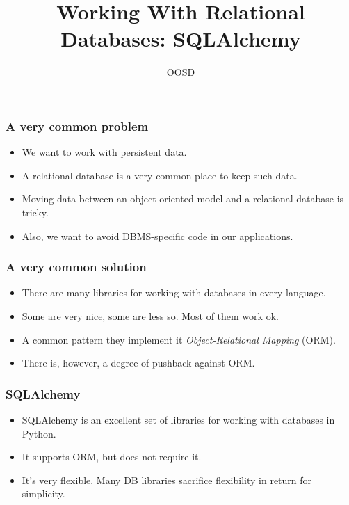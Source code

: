 \documentclass[10pt]{beamer}
\title{Working With Relational Databases: SQLAlchemy}
\author[IN710]{OOSD}
\institute[Otago Polytechnic]{
  School of Information Technology \\
  Otago Polytechnic \\
  Dunedin, New Zealand \\
}
\date{}
\begin{document}
\begin{frame}[plain]
  \titlepage
\end{frame}

\begin{frame}
	\frametitle{A very common problem}
	\begin{itemize}
		\item We want to work with persistent data.
		\item A relational database is a very common place to keep such data.
		\item Moving data between an object oriented model and a relational database is tricky.
		\item Also, we want to avoid DBMS-specific code in our applications.
	\end{itemize}
\end{frame}

\begin{frame}
	\frametitle{A very common solution}
	\begin{itemize}
		\item There are many libraries for working with databases in every language.
		\item Some are very nice, some are less so.  Most of them work ok.
		\item A common pattern they implement it \emph{Object-Relational Mapping} (ORM).
		\item There is, however, a degree of pushback against ORM.
	\end{itemize}
\end{frame}

\begin{frame}
	\frametitle{SQLAlchemy}
	\begin{itemize}
		\item SQLAlchemy is an excellent set of libraries for working with databases in Python.
		\item It supports ORM, but does not require it.
		\item It's very flexible.  Many DB libraries sacrifice flexibility in return for simplicity.
	\end{itemize}
\end{frame}
\end{document}
